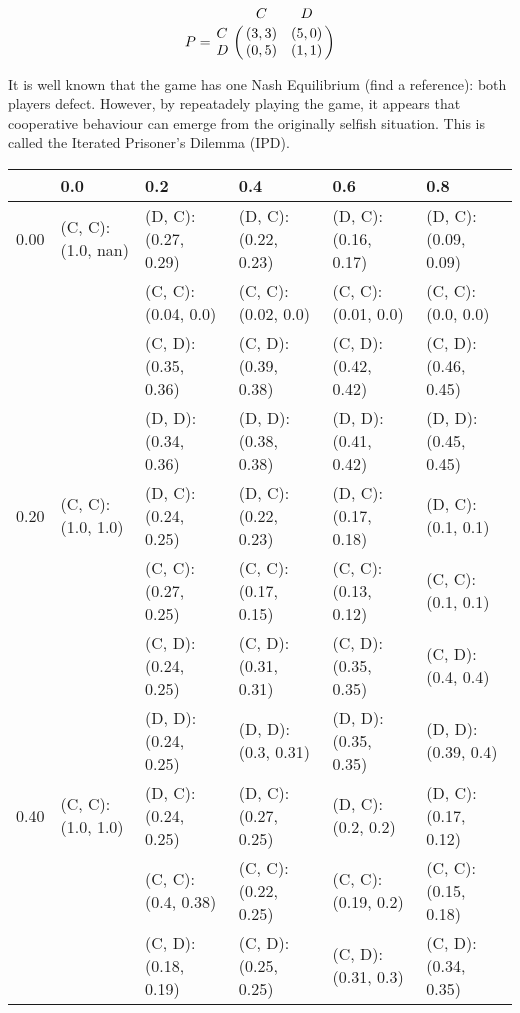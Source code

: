 \begin{equation}\label{eq:payoff_matrix}
% 
P = \bordermatrix{~ & C & D \cr
                  C & (3, 3) & (5, 0) \cr
                  D & (0, 5) & (1, 1) \cr}
% 
\end{equation}

It is well known that the game has one Nash Equilibrium (find a reference): both players defect.
However, by repeatadely playing the game, it appears that cooperative behaviour can emerge from the originally selfish situation.
This is called the Iterated Prisoner's Dilemma (IPD).

\begin{tabular}{ l | l l l l l }
     & 0.0                      & 0.2                        & 0.4                        & 0.6                        & 0.8 \\ 
\hline
0.00 & (C, C): (1.0, nan) & (D, C): (0.27, 0.29)  & (D, C): (0.22, 0.23)  & (D, C): (0.16, 0.17)  & (D, C): (0.09, 0.09) \\
     &                          &  (C, C): (0.04, 0.0)   &  (C, C): (0.02, 0.0)   &  (C, C): (0.01, 0.0)   &  (C, C): (0.0, 0.0) \\
     &                          &  (C, D): (0.35, 0.36)  &  (C, D): (0.39, 0.38)  &  (C, D): (0.42, 0.42)  &  (C, D): (0.46, 0.45) \\
     &                          &  (D, D): (0.34, 0.36) &  (D, D): (0.38, 0.38) &  (D, D): (0.41, 0.42) &  (D, D): (0.45, 0.45) \\ 
\hline
0.20 & (C, C): (1.0, 1.0) & (D, C): (0.24, 0.25)  & (D, C): (0.22, 0.23)  & (D, C): (0.17, 0.18)  & (D, C): (0.1, 0.1) \\
     &                          &  (C, C): (0.27, 0.25)  &  (C, C): (0.17, 0.15)  & (C, C): (0.13, 0.12)   &  (C, C): (0.1, 0.1) \\
     &                          &  (C, D): (0.24, 0.25)  &  (C, D): (0.31, 0.31)  & (C, D): (0.35, 0.35)   &  (C, D): (0.4, 0.4) \\
     &                          &  (D, D): (0.24, 0.25) &  (D, D): (0.3, 0.31)  & (D, D): (0.35, 0.35)  &  (D, D): (0.39, 0.4) \\ 
\hline
0.40 & (C, C): (1.0, 1.0) & (D, C): (0.24, 0.25)  & (D, C): (0.27, 0.25)  & (D, C): (0.2, 0.2)    & (D, C): (0.17, 0.12) \\
     &                          &  (C, C): (0.4, 0.38)   &  (C, C): (0.22, 0.25)  &  (C, C): (0.19, 0.2)   &  (C, C): (0.15, 0.18) \\
     &                          &  (C, D): (0.18, 0.19)  &  (C, D): (0.25, 0.25)  &  (C, D): (0.31, 0.3)   &  (C, D): (0.34, 0.35) \\

\end{tabular}
